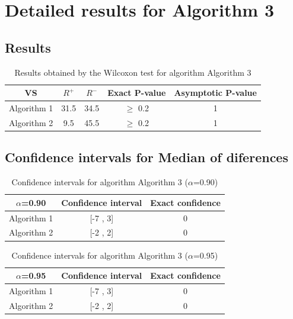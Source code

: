 \documentclass[a4paper,10pt]{article}
\begin{document}
 \clearpage 


\section{Detailed results for Algorithm 3}


\subsection{Results}

\begin{table}[!htp]
\centering\small
\begin{tabular}{
|c|c|c|c|c|}
\hline
 VS & $R^{+}$ & $R^{-}$ & Exact P-value & Asymptotic P-value \\ \hline 
Algorithm 1 & 31.5 & 34.5 & $\geq$ 0.2 & 1\\ \hline 
Algorithm 2 & 9.5 & 45.5 & $\geq$ 0.2 & 1\\ \hline 

\end{tabular}
\caption{Results obtained by the Wilcoxon test for algorithm Algorithm 3}
\end{table}

\subsection{Confidence intervals for Median of diferences}

\begin{table}[!htp]
\centering\small
\begin{tabular}{
|c|c|c|}
\hline
 $\alpha$=0.90 & Confidence interval & Exact confidence \\ \hline 
Algorithm 1 & [-7 , 3] & 0\\ \hline 
Algorithm 2 & [-2 , 2] & 0\\ \hline 

\end{tabular}
\caption{Confidence intervals for algorithm Algorithm 3 ($\alpha$=0.90)}
\end{table}
\begin{table}[!htp]
\centering\small
\begin{tabular}{
|c|c|c|}
\hline
 $\alpha$=0.95 & Confidence interval & Exact confidence \\ \hline 
Algorithm 1 & [-7 , 3] & 0\\ \hline 
Algorithm 2 & [-2 , 2] & 0\\ \hline 

\end{tabular}
\caption{Confidence intervals for algorithm Algorithm 3 ($\alpha$=0.95)}
\end{table}

 \clearpage 
\end{document}
